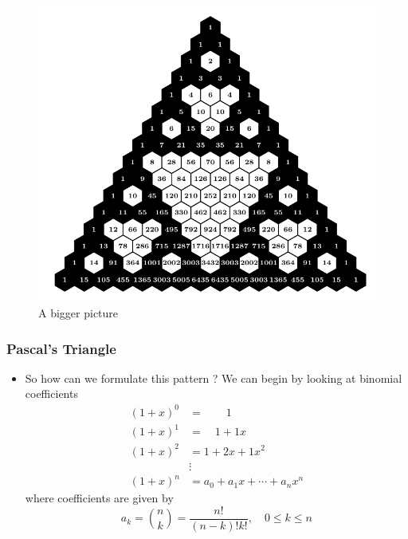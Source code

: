 \documentclass{beamer}
\begin{document}
\begin{frame}
    \begin{figure}
        \centering 
        \includegraphics[scale=0.8]{PascalMod2.pdf}
        \caption{A bigger picture}
    \end{figure}
\end{frame}

\begin{frame}
    \frametitle{Pascal's Triangle}
    \begin{itemize}
        \item So how can we formulate this pattern ? We can begin by looking at binomial coefficients
        \begin{align*}
            (1+x)^{0} &=\qquad 1 \\
            (1+x)^{1} &=\quad 1+1 x \\
            (1+x)^{2} &= 1+2 x+1 x^{2} \\
            & \vdots \\
            (1+x)^{n} &=a_{0}+a_{1} x+\cdots+a_{n} x^{n} 
        \end{align*}
        where coefficients are given by
        \begin{equation*}
            a_{k}= \binom{n}{k} =\frac{n !}{(n-k) ! k !}, \quad 0 \leq k \leq n
        \end{equation*}
    \end{itemize}
\end{frame}
\end{document}
